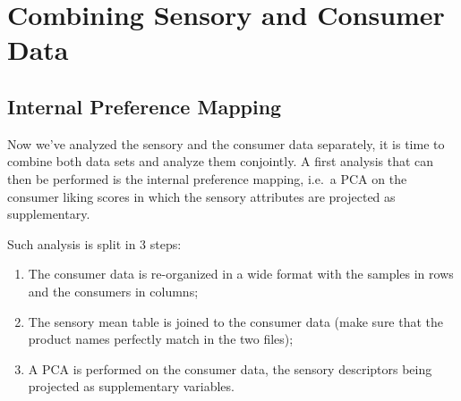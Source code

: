 \documentclass[
]{krantz}
\providecommand{\tightlist}{%
  \setlength{\itemsep}{0pt}\setlength{\parskip}{0pt}}
\begin{document}
\hypertarget{combining-sensory-and-consumer-data}{%
\section{Combining Sensory and Consumer Data}\label{combining-sensory-and-consumer-data}}

\hypertarget{internal-preference-mapping}{%
\subsection{Internal Preference Mapping}\label{internal-preference-mapping}}

Now we've analyzed the sensory and the consumer data separately, it is time to combine both data sets and analyze them conjointly. A first analysis that can then be performed is the internal preference mapping, i.e.~a PCA on the consumer liking scores in which the sensory attributes are projected as supplementary.

Such analysis is split in 3 steps:

\begin{enumerate}
\def\labelenumi{\arabic{enumi}.}
\tightlist
\item
  The consumer data is re-organized in a wide format with the samples in rows and the consumers in columns;
\item
  The sensory mean table is joined to the consumer data (make sure that the product names perfectly match in the two files);
\item
  A PCA is performed on the consumer data, the sensory descriptors being projected as supplementary variables.
\end{enumerate}
\end{document}
